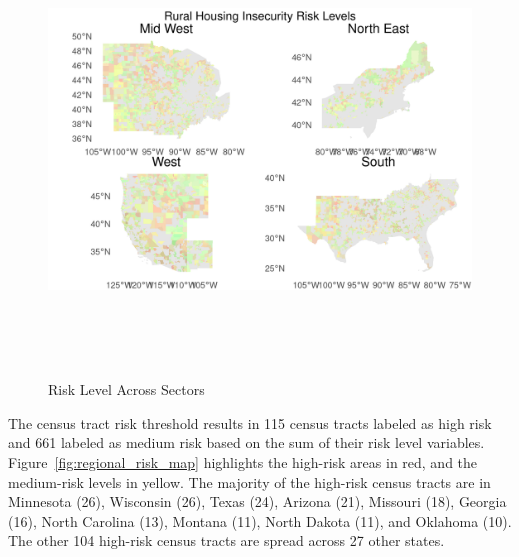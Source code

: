 

\begin{figure}[htbp]
    \centering
     \includegraphics[width=\textwidth, height=12cm]{plots/regional_map.png}
     \caption{Risk Level Across Sectors}
     \label{fig:regional_map}
 \end{figure}


 
 The census tract risk threshold results in 115 census tracts labeled as high risk and 661 labeled as medium risk based on the sum of their risk level variables. Figure~\ref{fig:regional_risk_map} highlights the high-risk areas in red, and the medium-risk levels in yellow. The majority of the high-risk census tracts are in Minnesota (26), Wisconsin (26), Texas (24), Arizona (21), Missouri (18), Georgia (16), North Carolina (13), Montana (11), North Dakota (11), and Oklahoma (10). The other 104 high-risk census tracts are spread across 27 other states. %

